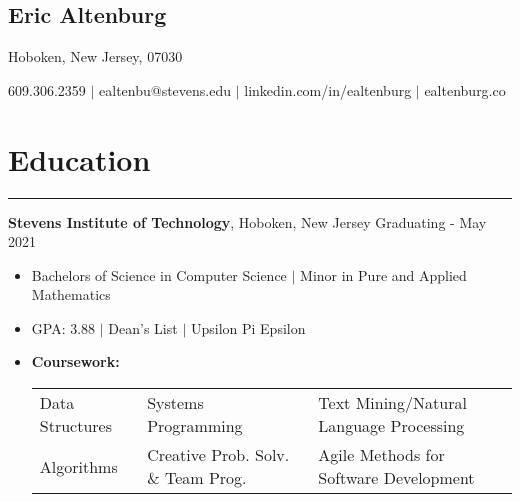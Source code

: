 \documentclass[10pt]{article}
\newcommand{\name}[1]{\begin{center}\section*{\huge #1}\end{center}}
\newcommand{\topinfo}[1]{\begin{center}\vspace{-0.15cm}#1\vspace{-0.15cm}\end{center}}
\newcommand{\resumesection}[1]{\vspace{-0.2cm}\section*{#1}\vspace{-0.2cm}\hrule\vspace{0.2cm}}
\begin{document}
\name{Eric Altenburg}
\topinfo{Hoboken, New Jersey, 07030}

\topinfo{609.306.2359 $\vert$ ealtenbu@stevens.edu $\vert$ linkedin.com/in/ealtenburg $\vert$ ealtenburg.co}








\resumesection{Education}
\textbf{Stevens Institute of Technology}, Hoboken, New Jersey \hfill Graduating - May 2021
\begin{itemize}
	\item[] Bachelors of Science in Computer Science $\vert$ Minor in Pure and Applied Mathematics
	\item[] GPA: 3.88 $\vert$ Dean's List $\vert$ Upsilon Pi Epsilon 
	\item[] \textbf{Coursework:}
	\setlength\tabcolsep{6 pt}
			\begin{tabular}[t]{l l l}
				Data Structures & Systems Programming & Text Mining/Natural Language Processing\\ %
				Algorithms & Creative Prob. Solv. \& Team Prog. & Agile Methods for Software Development
			\end{tabular}

\end{itemize}
\end{document}
